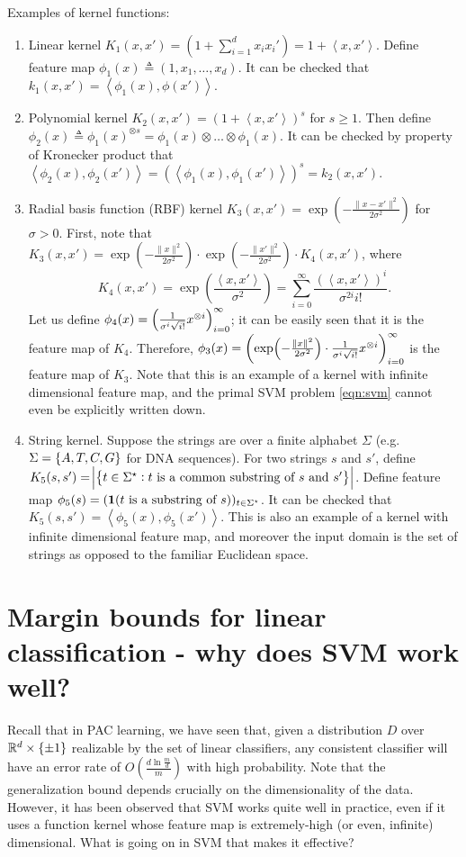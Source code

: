 \documentclass{article}
\newcommand{\RR}{\mathbb{R}} %
\newcommand{\defeq}{\triangleq}
\newcommand*{\one}{{\bf 1}}
\newcommand{\inner}[2]{\left\langle #1,#2 \right\rangle}
\begin{document}
Examples of kernel functions:
\begin{enumerate}
\item Linear kernel $K_1(x,x') = (1 + \sum_{i=1}^d x_i x_i') = 1 + \inner{x}{x'}$. Define feature map $\phi_1(x) \defeq (1, x_1, \ldots, x_d)$. It can be checked that $k_1(x,x') = \inner{\phi_1(x)}{\phi(x')}$.

\item Polynomial kernel $K_2(x,x') = (1 + \inner{x}{x'})^s$ for $s \geq 1$.
Then define $\phi_2(x) \defeq \phi_1(x)^{\otimes s} = \phi_1(x) \otimes \ldots \otimes \phi_1(x)$. It can be checked by property of Kronecker product that $\inner{\phi_2(x)}{\phi_2(x')} = (\inner{\phi_1(x)}{\phi_1(x')})^s = k_2(x,x')$.


\item Radial basis function (RBF) kernel $K_3(x,x') = \exp(-\frac{\|x-x'\|^2}{2\sigma^2})$ for $\sigma > 0$.
First, note that $K_3(x,x') = \exp(-\frac{\|x\|^2}{2\sigma^2}) \cdot \exp(-\frac{\|x'\|^2}{2\sigma^2}) \cdot K_4(x,x')$, where
\[ K_4(x,x') = \exp(\frac{\inner{x}{x'}}{\sigma^2}) = \sum_{i=0}^\infty \frac{(\inner{x}{x'})^i}{\sigma^{2i} i!}. \]
Let us define $\phi_4(x) = \del{ \frac{1}{\sigma^i \sqrt{i!}} x^{\otimes i} }_{i=0}^\infty$; it can be easily seen that it is the feature map of $K_4$.
Therefore, $\phi_3(x) = \del{ \exp(-\frac{\|x\|^2}{2\sigma^2}) \cdot \frac{1}{\sigma^i \sqrt{i!}} x^{\otimes i} }_{i=0}^\infty$ is the feature map of $K_3$. Note that this is an example of a kernel with infinite dimensional feature map, and the primal SVM problem \ref{eqn:svm} cannot even be explicitly written down.

\item String kernel. Suppose the strings are over a finite alphabet $\Sigma$ (e.g. $\Sigma = \cbr{A,T,C,G}$ for DNA sequences). For two strings $s$ and $s'$, define $K_5(s,s') = \abs{\cbr{t \in \Sigma^\star: t \text{ is a common substring of } s \text{ and } s'}}$. Define feature map $\phi_5(s) = (\one(t \text{  is a substring of } s))_{t \in \Sigma^\star}$.
It can be checked that $K_5(s,s') = \inner{\phi_5(x)}{\phi_5(x')}$. This is also an example of a kernel with infinite dimensional feature map, and moreover the input domain is the set of strings as opposed to the familiar Euclidean space.
\end{enumerate}


\section{Margin bounds for linear classification - why does SVM work well?}
Recall that in PAC learning, we have seen that, given a distribution $D$ over $\RR^d \times \cbr{\pm 1}$ realizable by the set of linear classifiers, any consistent classifier will have
 an error rate of $O(\frac{d\ln\frac{m}{d}}{m})$ with high probability.
 Note that
the generalization bound depends crucially on the dimensionality of the data.
 However, it has been observed that SVM works quite well in practice, even if it uses
 a function kernel whose feature map is extremely-high (or even, infinite) dimensional. What is going on in SVM that makes it effective?
\end{document}
